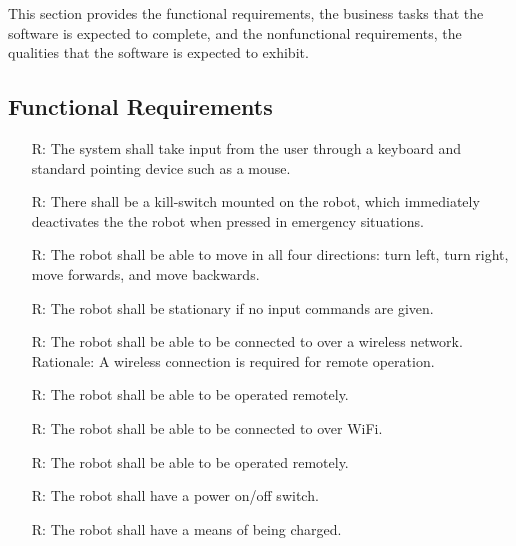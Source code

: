 \documentclass[12pt]{article}
\newcounter{reqnum} %
\begin{document}

This section provides the functional requirements, the business tasks that the
software is expected to complete, and the nonfunctional requirements, the
qualities that the software is expected to exhibit.

\subsection{Functional Requirements}

\noindent \begin{itemize}

\item[R\refstepcounter{reqnum}\thereqnum \label{R_Inputs1}:] The system shall take input from the user through a keyboard and standard pointing device such as a mouse.
\item[R\refstepcounter{reqnum}\thereqnum \label{R_Inputs2}:] There shall be a kill-switch mounted on the robot, which immediately deactivates the the robot when pressed in emergency situations.
\item[R\refstepcounter{reqnum}\thereqnum \label{R_Inputs3}:] The robot shall be able to move in all four directions: turn left, turn right, move forwards, and move backwards.
\item[R\refstepcounter{reqnum}\thereqnum \label{R_Inputs4}:] The robot shall be stationary if no input commands are given.
\item[R\refstepcounter{reqnum}\thereqnum \label{R_Inputs5}:] The robot shall be able to be connected to over a wireless network.
\newline Rationale: A wireless connection is required for remote operation.
\item[R\refstepcounter{reqnum}\thereqnum \label{R_Inputs6}:] The robot shall be able to be operated remotely.
\item[R\refstepcounter{reqnum}\thereqnum \label{R_Inputs5}:] The robot shall be able to be connected to over WiFi.
\item[R\refstepcounter{reqnum}\thereqnum \label{R_Inputs6}:] The robot shall be able to be operated remotely.
\item[R\refstepcounter{reqnum}\thereqnum \label{R_Inputs7}:] The robot shall have a power on/off switch.
\item[R\refstepcounter{reqnum}\thereqnum \label{R_Inputs8}:] The robot shall have a means of being charged.


\end{itemize}
\end{document}
